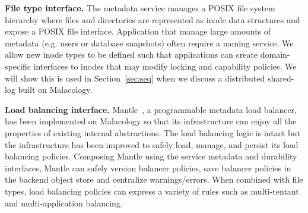 \documentclass[preprint]{sigplanconf-eurosys}
\begin{document}
{\bf File type interface.} The metadata service manages a POSIX file system
hierarchy where files and directories are represented as inode data structures
and expose a POSIX file interface. Application that manage large amounts of
metadata (e.g. users or database snapshots) often require a naming service. We
allow new inode types to be defined such that applications can create
domain-specific interfaces to inodes that may modify locking and capability
policies. We will show this is used in Section~\ref{sec:seq} when we discuss a
distributed shared-log built on Malacology.

{\bf Load balancing interface.} Mantle~\cite{sevilla:sc15-mantle}, a
programmable metadata load balancer, has been implemented on Malacology so that
its infrastructure can enjoy all the properties of existing internal
abstractions.  The load balancing logic is intact but the infrastructure has
been improved to safely load, manage, and persist its load balancing policies.
Composing Mantle using the service metadata and durability interfaces, Mantle
can safely version balancer policies, save balancer policies in the backend
object store and centralize warnings/errors. When combined with file types,
load balancing policies can express a variety of rules such as multi-tentant
and multi-application balancing.

\end{document}
